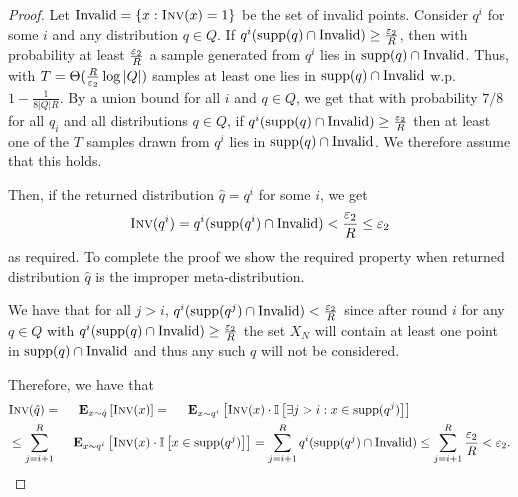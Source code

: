 \begin{proof}
  Let $ \text{Invalid} = \{x : \textsc{Inv}(x) = 1 \}$ be the set of invalid points.
  Consider $q^i$ for some $i$ and any distribution $q \in Q$. If $q^i( \text{supp}(q) \cap \text{Invalid} ) \ge \frac { \varepsilon_2 } { R }$, then with probability at least $\frac { \varepsilon_2 } { R }$ a sample generated from $q^i$ lies in $\text{supp}(q) \cap \text{Invalid}$. Thus, with $T = \Theta( \frac  { R } { \varepsilon_2 } \log |Q| )$ samples at least one lies in $\text{supp}(q) \cap \text{Invalid}$ w.p. $1 - \frac 1 {8 |Q| R}$. By a union bound for all $i$ and $q \in Q$, we get that with probability $7/8$ for all $q_i$ and all distributions $q \in Q$, if $q^i( \text{supp}(q) \cap \text{Invalid} ) \ge \frac { \varepsilon_2 } { R }$ then at least one of the $T$ samples drawn from $q^i$ lies in $\text{supp}(q) \cap \text{Invalid}$.
  We therefore assume that this holds.
  
  Then, if the returned distribution $\hat q = q^i$ for some $i$, we get $$\textsc{Inv}(q^i) = q^i( \text{supp}(q^i) \cap \text{Invalid} ) < \frac { \varepsilon_2 } { R } \le \varepsilon_2 $$ as required.
  To complete the proof we show the required property when returned distribution $\hat q$ is the improper meta-distribution.
  
  We have that for all $j > i$, $q^i( \text{supp}(q^j) \cap \text{Invalid} ) < \frac { \varepsilon_2 } { R }$ since after round $i$ for any $q \in Q$ with $q^i( \text{supp}(q) \cap \text{Invalid} ) \ge \frac { \varepsilon_2 } { R }$ the set $X_N$ will contain at least one point in $\text{supp}(q) \cap \text{Invalid}$ and thus any such $q$ will not be considered.
  
  Therefore, we have that 
 \begin{align*}
&    \Inv(\hat q) 
= \Exp_{x\sim\hat q}\left[ \Inv(x) \right]
= \Exp_{x\sim q^i}\left[ \Inv(x) \cdot \Ind\left[\exists j > i: x \in \Supp(q^j) \right]\right] \\
&\le  \sum_{j=i+1}^R \Exp_{x\sim q^i}\left[ \Inv(x) \cdot \Ind\left[ x \in \Supp(q^j) \right] \right]
= \sum_{j=i+1}^R q^i( \Supp(q^j) \cap \text{Invalid} ) \le  \sum_{j=i+1}^R \frac { \eps_2 } { R } <  \eps_2.
  \end{align*}
\end{proof}


